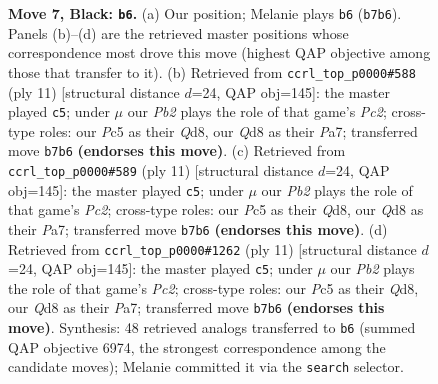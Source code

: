 \documentclass[11pt]{article}
\begin{document}
\begin{figure}[p]
\caption{\textbf{Move 7, Black: \texttt{b6}.} (a) Our position; Melanie plays \texttt{b6} (\texttt{b7b6}). Panels (b)--(d) are the retrieved master positions whose correspondence most drove this move (highest QAP objective among those that transfer to it). (b) Retrieved from \texttt{ccrl\_top\_p0000\#588} (ply 11) [structural distance $d$=24, QAP obj=145]: the master played \texttt{c5}; under $\mu$ our \emph{Pb2} plays the role of that game's \emph{Pc2}; cross-type roles: our \emph{P}c5 as their \emph{Q}d8, our \emph{Q}d8 as their \emph{P}a7; transferred move \texttt{b7b6} \textbf{(endorses this move)}. (c) Retrieved from \texttt{ccrl\_top\_p0000\#589} (ply 11) [structural distance $d$=24, QAP obj=145]: the master played \texttt{c5}; under $\mu$ our \emph{Pb2} plays the role of that game's \emph{Pc2}; cross-type roles: our \emph{P}c5 as their \emph{Q}d8, our \emph{Q}d8 as their \emph{P}a7; transferred move \texttt{b7b6} \textbf{(endorses this move)}. (d) Retrieved from \texttt{ccrl\_top\_p0000\#1262} (ply 11) [structural distance $d$=24, QAP obj=145]: the master played \texttt{c5}; under $\mu$ our \emph{Pb2} plays the role of that game's \emph{Pc2}; cross-type roles: our \emph{P}c5 as their \emph{Q}d8, our \emph{Q}d8 as their \emph{P}a7; transferred move \texttt{b7b6} \textbf{(endorses this move)}. Synthesis: 48 retrieved analogs transferred to \texttt{b6} (summed QAP objective 6974, the strongest correspondence among the candidate moves); Melanie committed it via the \texttt{search} selector.}
\label{fig:thought-m13}
\end{figure}

\clearpage
\end{document}
